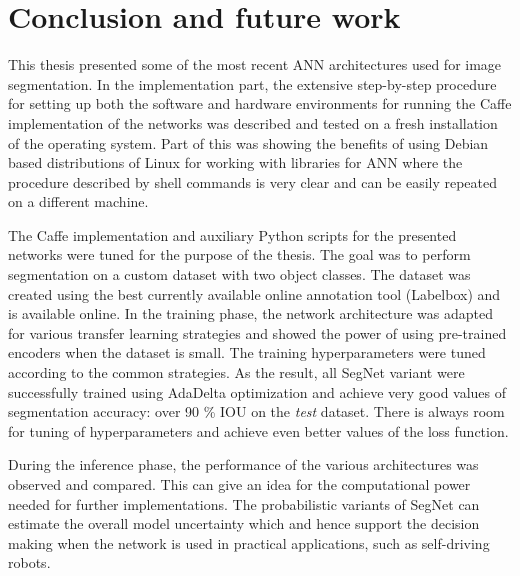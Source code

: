 \clearpage
\chapter{Conclusion and future work}

This thesis presented some of the most recent ANN architectures used for image segmentation. In the implementation part, the extensive step-by-step procedure for setting up both the software and hardware environments for running the Caffe implementation of the networks was described and tested on a fresh installation of the operating system. Part of this was showing the benefits of using Debian based distributions of Linux for working with libraries for ANN where the procedure described by shell commands is very clear and can be easily repeated on a different machine. 

The Caffe implementation and auxiliary Python scripts for the presented networks were tuned for the purpose of the thesis. The goal was to perform segmentation on a custom dataset with two object classes. The dataset was created using the best currently available online annotation tool (Labelbox) and is available online. In the training phase, the network architecture was adapted for various transfer learning strategies and showed the power of using pre-trained encoders when the dataset is small. The training hyperparameters were tuned according to the common strategies. As the result, all SegNet variant were successfully trained using AdaDelta optimization and achieve very good values of segmentation accuracy: over 90 \% IOU on the \textit{test} dataset. There is always room for tuning of hyperparameters and achieve even better values of the loss function. 

During the inference phase, the performance of the various architectures was observed and compared. This can give an idea for the computational power needed for further implementations. The probabilistic variants of SegNet can estimate the overall model uncertainty which and hence support the decision making when the network is used in practical applications, such as self-driving robots.
